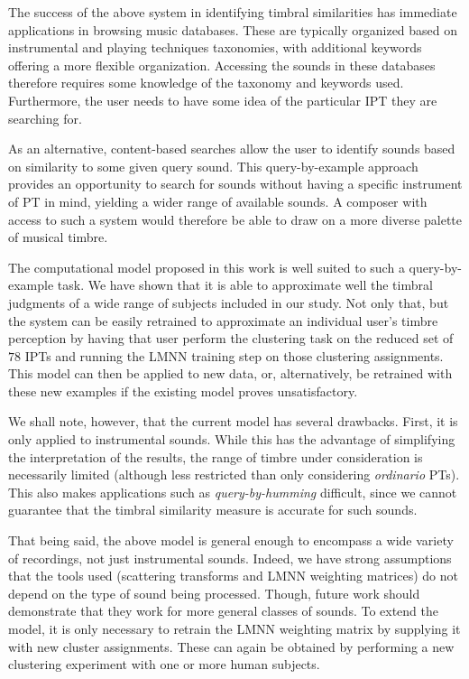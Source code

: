 \documentclass{bmcart}
\begin{document}
The success of the above system in identifying timbral similarities has immediate applications in browsing music databases.
These are typically organized based on instrumental and playing techniques taxonomies, with additional keywords offering a more flexible organization.
Accessing the sounds in these databases therefore requires some knowledge of the taxonomy and keywords used.
Furthermore, the user needs to have some idea of the particular IPT they are searching for.

As an alternative, content-based searches allow the user to identify sounds based on similarity to some given query sound.
This query-by-example approach provides an opportunity to search for sounds without having a specific instrument of PT in mind, yielding a wider range of available sounds.
A composer with access to such a system would therefore be able to draw on a more diverse palette of musical timbre.

The computational model proposed in this work is well suited to such a query-by-example task.
We have shown that it is able to approximate well the timbral judgments of a wide range of subjects included in our study.
Not only that, but the system can be easily retrained to approximate an individual user's timbre perception by having that user perform the clustering task on the reduced set of $78$ IPTs and running the LMNN training step on those clustering assignments.
This model can then be applied to new data, or, alternatively, be retrained with these new examples if the existing model proves unsatisfactory.

We shall note, however, that the current model has several drawbacks.
First, it is only applied to instrumental sounds.
While this has the advantage of simplifying the interpretation of the results, the range of timbre under consideration is necessarily limited (although less restricted than only considering \emph{ordinario} PTs).
This also makes applications such as \emph{query-by-humming} difficult, since we cannot guarantee that the timbral similarity measure is accurate for such sounds.

That being said, the above model is general enough to encompass a wide variety of recordings, not just instrumental sounds.
Indeed, we have strong assumptions that the tools used (scattering transforms and LMNN weighting matrices) do not depend on the type of sound being processed. Though, future work should demonstrate that they work for more general classes of sounds.
To extend the model, it is only necessary to retrain the LMNN weighting matrix by supplying it with new cluster assignments.
These can again be obtained by performing a new clustering experiment with one or more human subjects.
\end{document}
